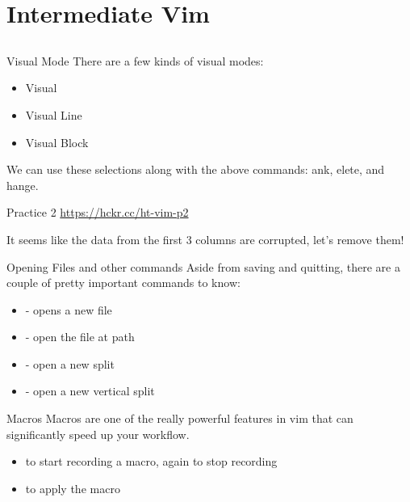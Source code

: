 \documentclass[12pt]{beamer}
\begin{document}
\section{Intermediate Vim}
\subsection{}
\begin{frame}{Visual Mode}
    There are a few kinds of visual modes:
    \begin{itemize}
        \item Visual 
        \item Visual Line 
        \item Visual Block 
    \end{itemize}{}{}
    We can use these selections along with the above commands: ank, elete, and hange.
\end{frame}{}

\begin{frame}{Practice 2}
    \url{https://hckr.cc/ht-vim-p2}

    It seems like the data from the first 3 columns are corrupted, let's remove them!
\end{frame}{}

\begin{frame}{Opening Files and other commands}
    Aside from saving and quitting, there are a couple of pretty important commands to know:
    \begin{itemize}
        \item {} - opens a new file
        \item {} - open the file at path
        \item {} - open a new split
        \item {} - open a new vertical split
    \end{itemize}{}
\end{frame}{}

\begin{frame}{Macros}
    Macros are one of the really powerful features in vim that can significantly speed up your workflow.
    \begin{itemize}
        \item {} to start recording a macro,  again to stop recording
        \item {} to apply the macro
    \end{itemize}{}

\end{frame}{}
\end{document}
